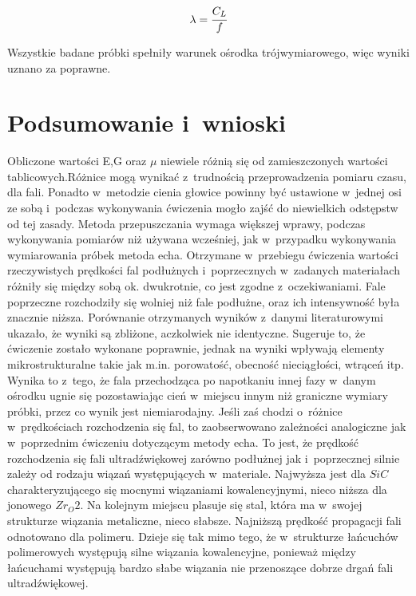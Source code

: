 \documentclass[a4paper,12pt]{article}
\begin{document}
$$\lambda=\cfrac{C_L}{f}$$



Wszystkie badane próbki spełniły warunek ośrodka trójwymiarowego, więc wyniki uznano za poprawne.
\newpage

\section{Podsumowanie i~wnioski}

Obliczone wartości E,G oraz $\mu$ niewiele różnią się od zamieszczonych wartości tablicowych.Różnice mogą wynikać z~trudnością przeprowadzenia  pomiaru czasu, dla fali. Ponadto w~metodzie cienia głowice powinny być ustawione w~jednej osi ze sobą i~podczas wykonywania ćwiczenia mogło zajść do niewielkich odstępstw od tej zasady. Metoda przepuszczania wymaga większej wprawy, podczas wykonywania pomiarów niż używana wcześniej, jak w~przypadku wykonywania wymiarowania próbek metoda echa.
Otrzymane w~przebiegu ćwiczenia wartości rzeczywistych   prędkości fal podłużnych i~poprzecznych w~zadanych materiałach różniły się między sobą ok. dwukrotnie, co jest zgodne z~oczekiwaniami. Fale poprzeczne rozchodziły się wolniej niż fale podłużne, oraz ich intensywność była znacznie niższa. 
Porównanie otrzymanych wyników z~danymi literaturowymi ukazało, że wyniki są zbliżone, aczkolwiek nie identyczne. Sugeruje to, że ćwiczenie zostało wykonane poprawnie, jednak na wyniki wpływają elementy mikrostrukturalne takie jak m.in. porowatość, obecność nieciągłości, wtrąceń itp. Wynika to z~tego, że fala przechodząca po napotkaniu innej fazy w~danym ośrodku ugnie się pozostawiając cień w~miejscu innym niż graniczne wymiary próbki, przez co wynik jest niemiarodajny. 
Jeśli zaś chodzi o~różnice w~prędkościach rozchodzenia się fal, to zaobserwowano zależności analogiczne jak w~poprzednim ćwiczeniu dotyczącym metody echa. To jest, że prędkość rozchodzenia się fali ultradźwiękowej zarówno podłużnej jak i~poprzecznej silnie zależy od rodzaju wiązań występujących w~materiale. Najwyższa jest dla $SiC$ charakteryzującego się mocnymi wiązaniami kowalencyjnymi, nieco niższa dla jonowego  $Zr_O2$. Na kolejnym miejscu plasuje się stal, która ma w~swojej strukturze wiązania metaliczne, nieco słabsze. Najniższą prędkość propagacji fali odnotowano dla polimeru. Dzieje się tak mimo tego, że w~strukturze łańcuchów polimerowych występują silne wiązania kowalencyjne, ponieważ między łańcuchami występują bardzo słabe wiązania nie przenoszące dobrze drgań fali ultradźwiękowej.
\end{document}
